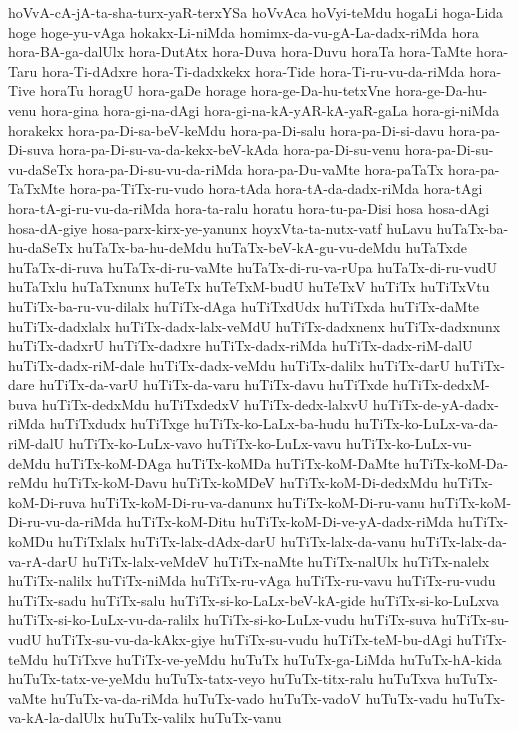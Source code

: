 {hoVvA-cA-jA-ta-sha-turx-yaR-terxYSa
hoVvAca
hoVyi-teMdu
hogaLi
hoga-Lida
hoge
hoge-yu-vAga
hokakx-Li-niMda
homimx-da-vu-gA-La-dadx-riMda
hora
hora-BA-ga-dalUlx
hora-DutAtx
hora-Duva
hora-Duvu
horaTa
hora-TaMte
hora-Taru
hora-Ti-dAdxre
hora-Ti-dadxkekx
hora-Tide
hora-Ti-ru-vu-da-riMda
hora-Tive
horaTu
horagU
hora-gaDe
horage
hora-ge-Da-hu-tetxVne
hora-ge-Da-hu-venu
hora-gina
hora-gi-na-dAgi
hora-gi-na-kA-yAR-kA-yaR-gaLa
hora-gi-niMda
horakekx
hora-pa-Di-sa-beV-keMdu
hora-pa-Di-salu
hora-pa-Di-si-davu
hora-pa-Di-suva
hora-pa-Di-su-va-da-kekx-beV-kAda
hora-pa-Di-su-venu
hora-pa-Di-su-vu-daSeTx
hora-pa-Di-su-vu-da-riMda
hora-pa-Du-vaMte
hora-paTaTx
hora-pa-TaTxMte
hora-pa-TiTx-ru-vudo
hora-tAda
hora-tA-da-dadx-riMda
hora-tAgi
hora-tA-gi-ru-vu-da-riMda
hora-ta-ralu
horatu
hora-tu-pa-Disi
hosa
hosa-dAgi
hosa-dA-giye
hosa-parx-kirx-ye-yanunx
hoyxVta-ta-nutx-vatf
huLavu
huTaTx-ba-hu-daSeTx
huTaTx-ba-hu-deMdu
huTaTx-beV-kA-gu-vu-deMdu
huTaTxde
huTaTx-di-ruva
huTaTx-di-ru-vaMte
huTaTx-di-ru-va-rUpa
huTaTx-di-ru-vudU
huTaTxlu
huTaTxnunx
huTeTx
huTeTxM-budU
huTeTxV
huTiTx
huTiTxVtu
huTiTx-ba-ru-vu-dilalx
huTiTx-dAga
huTiTxdUdx
huTiTxda
huTiTx-daMte
huTiTx-dadxlalx
huTiTx-dadx-lalx-veMdU
huTiTx-dadxnenx
huTiTx-dadxnunx
huTiTx-dadxrU
huTiTx-dadxre
huTiTx-dadx-riMda
huTiTx-dadx-riM-dalU
huTiTx-dadx-riM-dale
huTiTx-dadx-veMdu
huTiTx-dalilx
huTiTx-darU
huTiTx-dare
huTiTx-da-varU
huTiTx-da-varu
huTiTx-davu
huTiTxde
huTiTx-dedxM-buva
huTiTx-dedxMdu
huTiTxdedxV
huTiTx-dedx-lalxvU
huTiTx-de-yA-dadx-riMda
huTiTxdudx
huTiTxge
huTiTx-ko-LaLx-ba-hudu
huTiTx-ko-LuLx-va-da-riM-dalU
huTiTx-ko-LuLx-vavo
huTiTx-ko-LuLx-vavu
huTiTx-ko-LuLx-vu-deMdu
huTiTx-koM-DAga
huTiTx-koMDa
huTiTx-koM-DaMte
huTiTx-koM-Da-reMdu
huTiTx-koM-Davu
huTiTx-koMDeV
huTiTx-koM-Di-dedxMdu
huTiTx-koM-Di-ruva
huTiTx-koM-Di-ru-va-danunx
huTiTx-koM-Di-ru-vanu
huTiTx-koM-Di-ru-vu-da-riMda
huTiTx-koM-Ditu
huTiTx-koM-Di-ve-yA-dadx-riMda
huTiTx-koMDu
huTiTxlalx
huTiTx-lalx-dAdx-darU
huTiTx-lalx-da-vanu
huTiTx-lalx-da-va-rA-darU
huTiTx-lalx-veMdeV
huTiTx-naMte
huTiTx-nalUlx
huTiTx-nalelx
huTiTx-nalilx
huTiTx-niMda
huTiTx-ru-vAga
huTiTx-ru-vavu
huTiTx-ru-vudu
huTiTx-sadu
huTiTx-salu
huTiTx-si-ko-LaLx-beV-kA-gide
huTiTx-si-ko-LuLxva
huTiTx-si-ko-LuLx-vu-da-ralilx
huTiTx-si-ko-LuLx-vudu
huTiTx-suva
huTiTx-su-vudU
huTiTx-su-vu-da-kAkx-giye
huTiTx-su-vudu
huTiTx-teM-bu-dAgi
huTiTx-teMdu
huTiTxve
huTiTx-ve-yeMdu
huTuTx
huTuTx-ga-LiMda
huTuTx-hA-kida
huTuTx-tatx-ve-yeMdu
huTuTx-tatx-veyo
huTuTx-titx-ralu
huTuTxva
huTuTx-vaMte
huTuTx-va-da-riMda
huTuTx-vado
huTuTx-vadoV
huTuTx-vadu
huTuTx-va-kA-la-dalUlx
huTuTx-valilx
huTuTx-vanu
}
